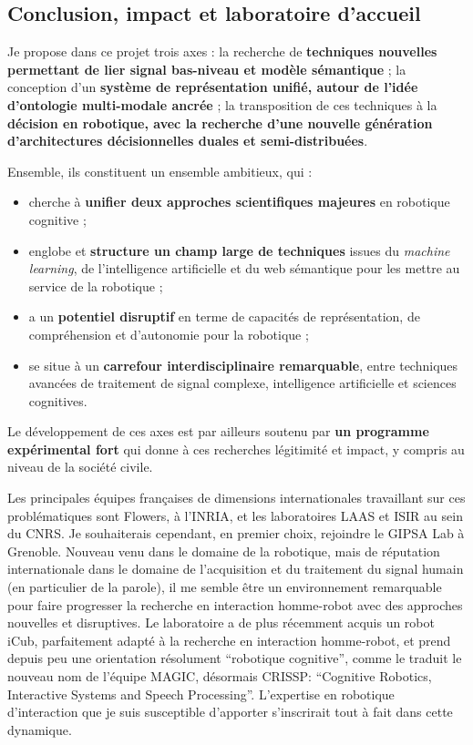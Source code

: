 \documentclass[a4paper]{article}
\begin{document}
\subsection*{Conclusion, impact et laboratoire d'accueil}

Je propose dans ce projet trois axes : la recherche de
\textbf{techniques nouvelles permettant de lier signal bas-niveau et modèle
sémantique} ; la conception d'un \textbf{système de représentation unifié,
autour de l'idée d'ontologie multi-modale ancrée} ; la transposition de ces
techniques à la \textbf{décision en robotique, avec la recherche d'une nouvelle
génération d'architectures décisionnelles duales et semi-distribuées}.

Ensemble, ils constituent un ensemble ambitieux, qui :
\begin{itemize}
    \item cherche à \textbf{unifier deux approches scientifiques majeures} en robotique
        cognitive ;
    \item englobe et \textbf{structure un champ large de techniques} issues du \emph{machine
        learning}, de l'intelligence artificielle et du web sémantique pour
        les mettre au service de la robotique ;
    \item a un \textbf{potentiel disruptif} en terme de capacités de représentation, de
        compréhension et d'autonomie pour la robotique ;
    \item se situe à un \textbf{carrefour interdisciplinaire remarquable}, entre
        techniques avancées de traitement de signal complexe, intelligence
        artificielle et sciences cognitives.
\end{itemize}

Le développement de ces axes est par ailleurs soutenu par \textbf{un programme
expérimental fort} qui donne à ces recherches légitimité et impact, y compris au
niveau de la société civile.

Les principales équipes françaises de dimensions internationales travaillant sur
ces problématiques sont Flowers, à l'INRIA, et les laboratoires LAAS et ISIR au
sein du CNRS. Je souhaiterais cependant, en premier choix, rejoindre le GIPSA
Lab à Grenoble.  Nouveau venu dans le domaine de la robotique, mais de
réputation internationale dans le domaine de l'acquisition et du traitement du
signal humain (en particulier de la parole), il me semble être un environnement
remarquable pour faire progresser la recherche en interaction homme-robot avec
des approches nouvelles et disruptives. Le laboratoire a de plus récemment
acquis un robot iCub, parfaitement adapté à la recherche en interaction
homme-robot, et prend depuis peu une orientation résolument ``robotique
cognitive'', comme le traduit le nouveau nom de l'équipe MAGIC, désormais
CRISSP: ``Cognitive Robotics, Interactive Systems and Speech Processing''.
L'expertise en robotique d'interaction que je suis susceptible d'apporter
s'inscrirait tout à fait dans cette dynamique.
\end{document}
